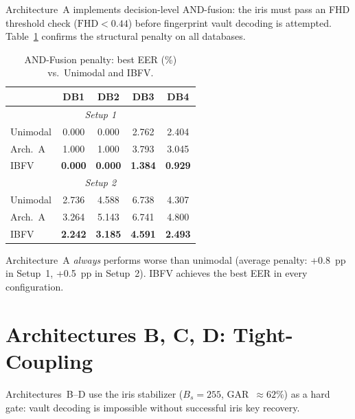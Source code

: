 Architecture~A implements decision-level AND-fusion: the iris must pass an FHD
threshold check ($\text{FHD} < 0.44$) before fingerprint vault decoding is
attempted. Table~\ref{tab:arch_a} confirms the structural penalty on all databases.

\begin{table}[h]
\centering
\caption{AND-Fusion penalty: best EER (\%) vs.\ Unimodal and IBFV.}
\label{tab:arch_a}
\small
\begin{tabular}{@{}l cccc@{}}
\toprule
 & \textbf{DB1} & \textbf{DB2} & \textbf{DB3} & \textbf{DB4} \\
\midrule
\multicolumn{5}{c}{\textit{Setup 1}} \\
\midrule
Unimodal & 0.000 & 0.000 & 2.762 & 2.404 \\
Arch.~A  & 1.000 & 1.000 & 3.793 & 3.045 \\
IBFV     & \textbf{0.000} & \textbf{0.000} & \textbf{1.384} & \textbf{0.929} \\
\midrule
\multicolumn{5}{c}{\textit{Setup 2}} \\
\midrule
Unimodal & 2.736 & 4.588 & 6.738 & 4.307 \\
Arch.~A  & 3.264 & 5.143 & 6.741 & 4.800 \\
IBFV     & \textbf{2.242} & \textbf{3.185} & \textbf{4.591} & \textbf{2.493} \\
\bottomrule
\end{tabular}
\end{table}

Architecture~A \emph{always} performs worse than unimodal (average penalty: +0.8~pp
in Setup~1, +0.5~pp in Setup~2). IBFV achieves the best EER in every configuration.

\section{Architectures B, C, D: Tight-Coupling}
\label{sec:arch_bcd_results}

Architectures~B--D use the iris stabilizer ($B_s = 255$, GAR~$\approx 62\%$) as a
hard gate: vault decoding is impossible without successful iris key recovery.

